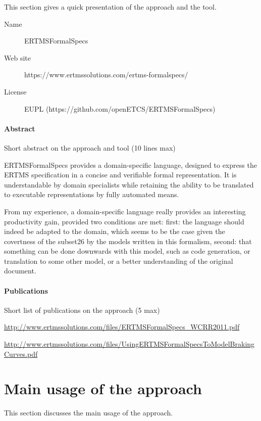 This section gives a quick presentation of the approach and the tool.

\begin{description}
\item[Name] ERTMSFormalSpecs
\item[Web site] https://www.ertmssolutions.com/ertms-formalspecs/
\item[License] EUPL (https://github.com/openETCS/ERTMSFormalSpecs)
\end{description}

\paragraph{Abstract} Short abstract on the approach and tool (10 lines max)

ERTMSFormalSpecs provides a domain-specific language, designed to express the ERTMS specification in a concise and verifiable formal representation. It is understandable by domain specialists while retaining the ability to be translated to executable representations by fully automated means.

\begin{assessor1}
From my experience, a domain-specific language really provides an interesting productivity gain, provided two conditions are met: first: the language should indeed be adapted to the domain, which seems to be the case given the covertness of the subset26 by the models written in this formalism, second: that something can be done downwards with this model, such as code generation, or translation to some other model, or a better understanding of the original document. 
\end{assessor1}

\paragraph{Publications} Short list of publications on the approach (5 max)

\url{http://www.ertmssolutions.com/files/ERTMSFormalSpecs\_WCRR2011.pdf   }

\url{http://www.ertmssolutions.com/files/UsingERTMSFormalSpecsToModelBrakingCurves.pdf}

\section{Main usage of the approach}
\label{main_usage}
This section discusses the main usage of the approach.

